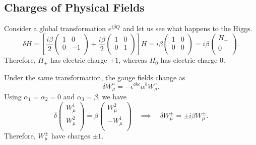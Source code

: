 \subsection{Charges of Physical Fields}%
\label{sub:charges_of_physical_fields}

Consider a global transformation $e^{i \beta Q}$ and let us see what happens to the Higgs.
\begin{equation}
  \delta H = \left[ \frac{i \beta}{2} 
    \begin{pmatrix}
     1 & 0 \\
     0 & -1 \\
    \end{pmatrix}
    + \frac{i \beta}{2}
    \begin{pmatrix}
     1 & 0 \\
     0 & 1 \\
    \end{pmatrix} \right] H
    = i \beta 
    \begin{pmatrix}
     1 & 0 \\
     0 & 0 \\
    \end{pmatrix} = i \beta 
    \begin{pmatrix}
    H_+ \\
    0 \\
    \end{pmatrix}.
\end{equation}
Therefore, $H_+$ has electric charge $+1$, whereas $H_0$ has electric charge $0$.

Under the same transformation, the gauge fields change as
\begin{equation}
  \delta W_{\mu}^{a} = -\epsilon^{abc} \alpha^{b} W_{\mu}^{c}.
\end{equation}
Using $\alpha_1 = \alpha_2 = 0$ and $\alpha_3 = \beta$, we have
\begin{equation}
  \delta 
  \begin{pmatrix}
  W_{\mu}^1 \\
  W^2_{\mu} \\
  \end{pmatrix} = \beta
  \begin{pmatrix}
  W_{\mu}^2 \\
  -W_{\mu}^1 \\
  \end{pmatrix} \quad \implies \quad
  \delta W^{\pm}_{\mu} = \pm i \beta W^{\pm}_{\mu}.
\end{equation}
Therefore, $W^{\pm}_{\mu}$ have charges $\pm 1$.

